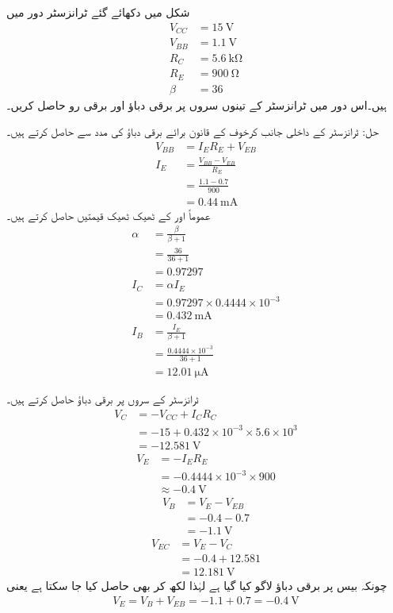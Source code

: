 شکل    میں دکھائے گئے ٹرانزسٹر دور میں
\begin{align*}
V_{CC} &=\SI{15}{\volt}\\
V_{BB} &=\SI{1.1}{\volt}\\
R_C&=\SI{5.6}{\kilo \ohm} \\
R_E &=\SI{900}{\ohm} \\
\beta &=36
\end{align*}
 ہیں۔اس دور میں ٹرانزسٹر کے تینوں سروں پر برقی دباؤ اور برقی رو حاصل کریں۔

حل:
ٹرانزسٹر کے داخلی جانب کرخوف کے قانون برائے برقی دباؤ کی مدد سے  حاصل کرتے ہیں۔
\begin{align*}
V_{BB} &=I_{E}R_{E}+V_{EB}\\
I_E&=\frac{V_{BB}-V_{EB}}{R_E}\\
&=\frac{1.1-0.7}{900}\\
&=\SI{0.44}{\milli \ampere}
\end{align*}
عموماً اور    کے ٹھیک ٹھیک قیمتیں حاصل کرتے ہیں۔
\begin{align*}
\alpha&=\frac{\beta}{\beta+1}\\
&=\frac{36}{36+1}\\
&=\num{0.97297}
\\
I_C&=\alpha I_E\\
&=0.97297 \times  0.4444  \times 10^{-3}\\
&=\SI{0.432}{\milli \ampere}\\
I_B&=\frac{I_E}{\beta+1}\\
&=\frac{0.4444 \times 10^{-3}}{36+1}\\
&=\SI{12.01}{\micro \ampere}
\end{align*}

ٹرانزسٹر کے سروں پر برقی دباؤ حاصل کرتے ہیں۔
\begin{align*}
V_C&=-V_{CC}+I_{C}R_{C}\\
&=-15+0.432 \times 10^{-3} \times 5.6 \times 10^{3}\\
&=\SI{-12.581}{\volt}
\end{align*}
%
\begin{align*}
V_E&=-I_{E}R_{E}\\
&=-0.4444 \times 10^{-3} \times 900\\
&\approx \SI{-0.4}{\volt}
\end{align*}
%
\begin{align*}
V_B&=V_E-V_{EB}\\
&=-0.4-0.7\\
&=\SI{-1.1}{\volt}
\end{align*}
%
\begin{align*}
V_{EC}&=V_E-V_C\\
&=-0.4+12.581\\
&=\SI{12.181}{\volt}
\end{align*}
چونکہ بیس پر برقی دباؤ  لاگو کیا گیا ہے لہٰذا  لکھ کر بھی حاصل کیا جا سکتا ہے یعنی
\begin{align*}
V_E=V_B+V_{EB}=-1.1+0.7=\SI{-0.4}{\volt}
\end{align*}


